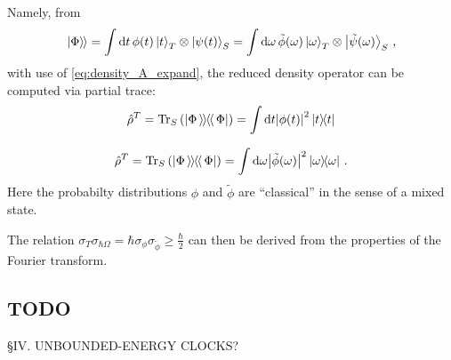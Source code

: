 Namely, from
\begin{equation}
  \left.\left| \Phi \right\rangle\hspace{-0.115em}\right\rangle =
    \int \dd{t} \phi(t) \ket{t}_T \otimes \ket{\psi(t)}_S =
    \int \dd \omega \, \tilde{\phi}(\omega) \ket{\omega}_T \otimes \ket{\tilde{\psi}(\omega)}_S \, \text{,}
\end{equation}
with use of \eqref{eq:density_A_expand}, the reduced density operator can be computed
via partial trace:
\[
  \hat{\rho}^T = \Tr_S\qty(\left| \Phi \left\rangle\hspace{-0.115em}\left\rangle \hspace{-0.115em} \right\langle\hspace{-0.115em}\right\langle \Phi \right|) = \int \dd t \abs{\phi(t)}^2 \ketbra{t}{t} 
\]

\[
  \hat{\rho}^T = \Tr_S\qty(\left| \Phi \left\rangle\hspace{-0.115em}\left\rangle \hspace{-0.115em} \right\langle\hspace{-0.115em}\right\langle \Phi \right|) = \int \dd \omega \abs{\tilde{\phi}(\omega)}^2 \ketbra{\omega}{\omega}
  \,\text{.} 
\]
Here the probabilty distributions $\phi$ and $\tilde{\phi}$
are ``classical'' in the sense of a mixed state.

The relation $\sigma_T\sigma_{\hbar\Omega} = \hbar \sigma_{\phi} \sigma_{\tilde{\phi}} \geq \frac{\hbar}{2}$
can then be derived from the properties of the Fourier transform.

\subsection{TODO}
\cite{Maccone:Pauli} \S IV.  UNBOUNDED-ENERGY CLOCKS?